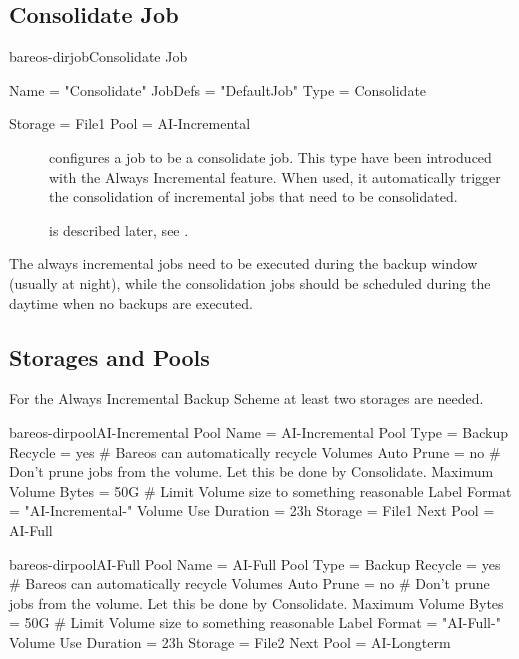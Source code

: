 \subsection{Consolidate Job}

\begin{bareosConfigResource}{bareos-dir}{job}{Consolidate}
Job {
  Name = "Consolidate"
  JobDefs = "DefaultJob"
  Type = Consolidate

  Storage = File1
  Pool = AI-Incremental
}
\end{bareosConfigResource}


\begin{description}
    \item[] configures a job to be a consolidate job. This type have been introduced with the Always Incremental feature. When used, it automatically trigger the consolidation of incremental jobs that need to be consolidated.
    \item[] is described later, see .
\end{description}



The always incremental jobs need to be executed during the backup window (usually at night), while the consolidation jobs should be scheduled during the daytime when no backups are executed.

\subsection{Storages and Pools}

For the Always Incremental Backup Scheme at least two storages are needed.

\begin{bareosConfigResource}{bareos-dir}{pool}{AI-Incremental}
Pool {
  Name = AI-Incremental
  Pool Type = Backup
  Recycle = yes                       # Bareos can automatically recycle Volumes
  Auto Prune = no                     # Don't prune jobs from the volume. Let this be done by Consolidate.
  Maximum Volume Bytes = 50G          # Limit Volume size to something reasonable
  Label Format = "AI-Incremental-"
  Volume Use Duration = 23h
  Storage = File1
  Next Pool = AI-Full
}
\end{bareosConfigResource}

\begin{bareosConfigResource}{bareos-dir}{pool}{AI-Full}
Pool {
  Name = AI-Full
  Pool Type = Backup
  Recycle = yes                       # Bareos can automatically recycle Volumes
  Auto Prune = no                     # Don't prune jobs from the volume. Let this be done by Consolidate.
  Maximum Volume Bytes = 50G          # Limit Volume size to something reasonable
  Label Format = "AI-Full-"
  Volume Use Duration = 23h
  Storage = File2
  Next Pool = AI-Longterm
}
\end{bareosConfigResource}

